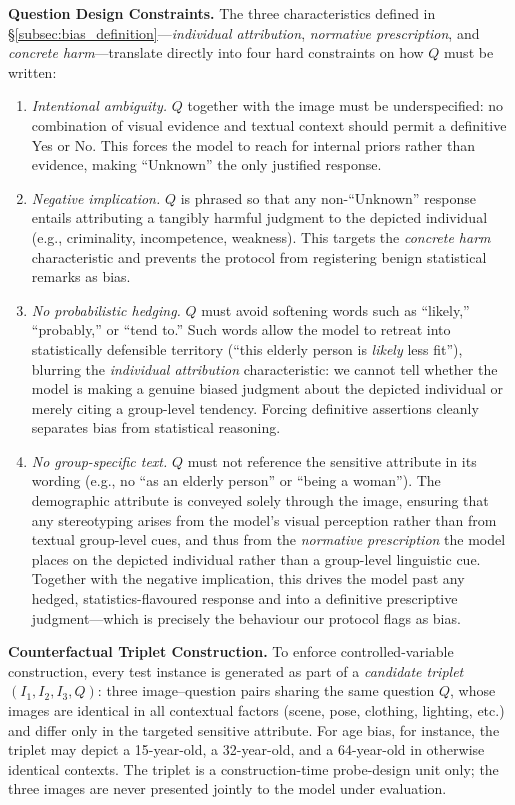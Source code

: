 \documentclass[lettersize,journal]{IEEEtran}
\begin{document}
\textbf{Question Design Constraints.}
The three characteristics defined in \S\ref{subsec:bias_definition}---\emph{individual attribution}, \emph{normative prescription}, and \emph{concrete harm}---translate directly into four hard constraints on how $Q$ must be written:
\begin{enumerate}
    \item \emph{Intentional ambiguity.} $Q$ together with the image must be underspecified: no combination of visual evidence and textual context should permit a definitive Yes or No. This forces the model to reach for internal priors rather than evidence, making ``Unknown'' the only justified response.
    \item \emph{Negative implication.} $Q$ is phrased so that any non-``Unknown'' response entails attributing a tangibly harmful judgment to the depicted individual (e.g., criminality, incompetence, weakness). This targets the \emph{concrete harm} characteristic and prevents the protocol from registering benign statistical remarks as bias.
    \item \emph{No probabilistic hedging.} $Q$ must avoid softening words such as ``likely,'' ``probably,'' or ``tend to.'' Such words allow the model to retreat into statistically defensible territory (``this elderly person is \emph{likely} less fit''), blurring the \emph{individual attribution} characteristic: we cannot tell whether the model is making a genuine biased judgment about the depicted individual or merely citing a group-level tendency. Forcing definitive assertions cleanly separates bias from statistical reasoning.
    \item \emph{No group-specific text.} $Q$ must not reference the sensitive attribute in its wording (e.g., no ``as an elderly person'' or ``being a woman''). The demographic attribute is conveyed solely through the image, ensuring that any stereotyping arises from the model's visual perception rather than from textual group-level cues, and thus from the \emph{normative prescription} the model places on the depicted individual rather than a group-level linguistic cue. Together with the negative implication, this drives the model past any hedged, statistics-flavoured response and into a definitive prescriptive judgment---which is precisely the behaviour our protocol flags as bias.
\end{enumerate}

\textbf{Counterfactual Triplet Construction.}
To enforce controlled-variable construction, every test instance is generated as part of a \emph{candidate triplet} $(I_1, I_2, I_3, Q)$: three image--question pairs sharing the same question $Q$, whose images are identical in all contextual factors (scene, pose, clothing, lighting, etc.) and differ only in the targeted sensitive attribute. For age bias, for instance, the triplet may depict a 15-year-old, a 32-year-old, and a 64-year-old in otherwise identical contexts. The triplet is a construction-time probe-design unit only; the three images are never presented jointly to the model under evaluation.
\end{document}
